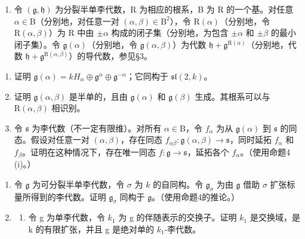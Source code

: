 \begin{enumerate}
\def\labelenumi{\arabic{enumi})}
\setcounter{enumi}{2}
\tightlist
\item
  令 \((\mathfrak{g},\mathfrak{h})\) 为分裂半单李代数，R 为相应的根系，B 为 R 的一个基。对任意 \(\alpha \in \mathrm{B}\)（分别地，对任意一对 \((\alpha ,\beta)\in \mathrm{B}^2\)），令 \(\mathrm{R}(\alpha)\)（分别地，令 \(\mathrm{R}(\alpha ,\beta)\)）为 R 中由 \(\pm \alpha\) 构成的闭子集（分别地，为包含 \(\pm \alpha\) 和 \(\pm \beta\) 的最小闭子集）。令 \(\mathfrak{g}(\alpha)\)（分别地，令 \(\mathfrak{g}(\alpha ,\beta)\)）为代数 \(\mathfrak{h} + \mathfrak{g}^{\mathrm{R}(\alpha)}\)（分别地，代数 \(\mathfrak{h} + \mathfrak{g}^{\mathrm{R}(\alpha ,\beta)}\)）的导代数，参见§3。
\end{enumerate}

\begin{enumerate}
\def\labelenumi{\alph{enumi})}
\item
  证明 \(\mathfrak{g}(\alpha) = kH_{\alpha}\oplus \mathfrak{g}^{\alpha}\oplus \mathfrak{g}^{-\alpha}\)；它同构于 \(\mathfrak{sl}(2,k)\)。
\item
  证明 \(\mathfrak{g}(\alpha,\beta)\) 是半单的，且由 \(\mathfrak{g}(\alpha)\) 和 \(\mathfrak{g}(\beta)\) 生成。其根系可以与 \(\mathrm{R}(\alpha,\beta)\) 相识别。
\item
  令 \(\mathfrak{s}\) 为李代数（不一定有限维）。对所有 \(\alpha \in \mathrm{B}\)，令 \(f_{\alpha}\) 为从 \(\mathfrak{g}(\alpha)\) 到 \(\mathfrak{s}\) 的同态。假设对任意一对 \((\alpha, \beta)\)，存在同态 \(f_{\alpha \beta}: \mathfrak{g}(\alpha, \beta) \to \mathfrak{s}\)，同时延拓 \(f_{\alpha}\) 和 \(f_{\beta}\)。证明在这种情况下，存在唯一同态 \(f: \mathfrak{g} \to \mathfrak{s}\)，延拓各个 \(f_{\alpha}\)。（使用命题4 (i)。）
\end{enumerate}

\begin{enumerate}
\def\labelenumi{\arabic{enumi})}
\setcounter{enumi}{3}
\item
  令 \(\mathfrak{g}\) 为可分裂半单李代数，令 \(\sigma\) 为 \(k\) 的自同构。令 \(\mathfrak{g}_{\sigma}\) 为由 \(\mathfrak{g}\) 借助 \(\sigma\) 扩张标量所得到的李代数。证明 \(\mathfrak{g}_{\sigma}\) 同构于 \(\mathfrak{g}\)。（使用命题4的推论。）
\item
  \begin{enumerate}
  \def\labelenumii{\alph{enumii})}
  \tightlist
  \item
    令 g 为单李代数，令 \(k_{1}\) 为 g 的伴随表示的交换子。证明 \(k_{1}\) 是交换域，是 k 的有限扩张，并且 g 是绝对单的 \(k_{1}\)-李代数。
  \end{enumerate}
\end{enumerate}

